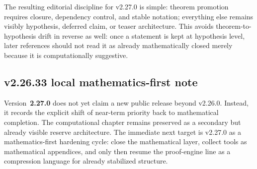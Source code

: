 The resulting editorial discipline for v2.27.0 is simple: theorem promotion requires closure, dependency control, and stable notation; everything else remains visibly hypothesis, deferred claim, or teaser architecture. This avoids theorem-to-hypothesis drift in reverse as well: once a statement is kept at hypothesis level, later references should not read it as already mathematically closed merely because it is computationally suggestive.

\subsection*{v2.26.33 local mathematics-first note}

Version~\textbf{2.27.0} does not yet claim a new public release beyond v2.26.0. Instead, it records the explicit shift of near-term priority back to mathematical completion. The computational chapter remains preserved as a secondary but already visible reserve architecture. The immediate next target is v2.27.0 as a mathematics-first hardening cycle: close the mathematical layer, collect tools as mathematical appendices, and only then resume the proof-engine line as a compression language for already stabilized structure.


